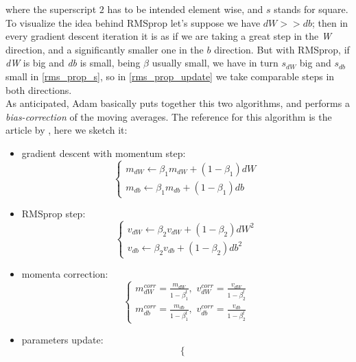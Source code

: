 \documentclass[12pt, a4paper]{report}
\theoremstyle{definition}
\begin{document}
{\begin{itemize}
\begin{equation}
	\end{equation}
\end{itemize}
where the superscript $2$ has to be intended element wise, and $s$ stands for square.\\
To visualize the idea behind RMSprop let's suppose we have $dW>>db$; then in every gradient descent iteration it is as if we are taking a great step in the \textit{W} direction, and a significantly smaller one in the $b$ direction. But with RMSprop, if \textit{dW} is big and \textit{db} is small, being $\beta$ usually small, we have in turn $s_{dW}$ big and $s_{db}$ small in \eqref{rms_prop_s}, so in \eqref{rms_prop_update} we take comparable steps in both directions.\\
As anticipated, Adam basically puts together this two algorithms, and performs a \textit{bias-correction} of the moving averages. The reference for this algorithm is the article by \cite{Kingma}, here we sketch it:
\begin{itemize}\label{Adam}
	\item gradient descent with momentum step:
	\begin{equation*}
	\begin{cases}
	m_{dW}\longleftarrow\beta_1 m_{dW} + (1-\beta_1) dW\\
	m_{db}\longleftarrow\beta_1 m_{db} + (1-\beta_1) db
	\end{cases}
	\end{equation*}
	\item RMSprop step:
	\begin{equation*}
	\begin{cases}
	v_{dW}\longleftarrow\beta_2 v_{dW} + (1-\beta_2) dW^2\\
	v_{db}\longleftarrow\beta_2 v_{db} + (1-\beta_2) db^2
	\end{cases}
	\end{equation*}
	\item momenta correction:
	\begin{equation*}
	\begin{cases}
	m_{dW}^{corr}=\frac{m_{dW}}{1-\beta_1^t},\,\, v_{dW}^{corr}=\frac{v_{dW}}{1-\beta_2^t}\\
	m_{db}^{corr}=\frac{m_{db}}{1-\beta_1^t},\,\, v_{db}^{corr}=\frac{v_{db}}{1-\beta_2^t}
	\end{cases}
	\end{equation*}
	\item parameters update:
	\begin{equation*}
	\begin{cases}

\end{cases}
\end{equation*}
\end{itemize}}
\end{document}
